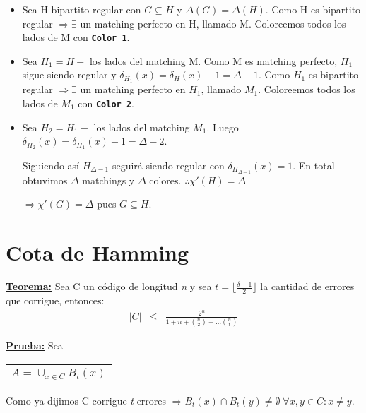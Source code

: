 \documentclass[12pt,a4paper]{report}
\newcounter{neq}
\begin{document}
			\vspace{5mm}
			\begin{itemize}
				\item Sea H bipartito regular con $G \subseteq H$ y $\Delta(G) = \Delta(H)$. Como H es bipartito regular $\Rightarrow \exists$ un matching perfecto en H, llamado M. Coloreemos todos los lados de M con \textbf{\texttt{Color 1}}.
				\item Sea $H_{1} = H - $ los lados del matching M. Como M es matching perfecto, $H_{1}$ sigue siendo regular y $\delta_{H_{1}}(x) = \delta_{H}(x) - 1 = \Delta - 1$. Como $H_{1}$ es bipartito regular $\Rightarrow \exists$ un matching perfecto en $H_{1}$, llamado $M_{1}$. Coloreemos todos los lados de $M_{1}$ con \textbf{\texttt{Color 2}}.
				\item Sea $H_{2} = H_{1} - $ los lados del matching $M_{1}$. Luego $\delta_{H_{2}}(x) = \delta_{H_{1}}(x) - 1 = \Delta - 2$.
					\par Siguiendo así $H_{\Delta - 1}$ seguirá siendo regular con $ \delta_{H_{\Delta - 1}}(x) = 1$. En total obtuvimos $ \Delta $ matchings y $ \Delta $ colores. $\therefore \chi '(H) = \Delta$
					\begin{center}
						$\Rightarrow \chi ' (G) = \Delta$ pues $G \subseteq H$.
					\end{center}
			\end{itemize}


	\section{Cota de Hamming}
		\textbf{\underline{Teorema:}} Sea C un código de longitud \textit{n} y sea $ t = \lfloor \frac{\delta - 1}{2} \rfloor$ la cantidad de errores que corrigue, entonces:
			\begin{eqnarray}
				\nonumber \lvert C \rvert &\leq & \frac{2^{n}}{1 + n + {n \choose 2} + \dotsc {n \choose t}}
			\end{eqnarray}

		\textbf{\underline{Prueba:}} Sea \begin{tabular}{|c|} \hline $ A = \cup_{x \in C} B_{t}(x) $ \\ \hline \end{tabular}

			\vspace{3mm}
				\par Como ya dijimos C corrigue \textit{t} errores $\Rightarrow B_{t}(x) \cap B_{t}(y) \neq \emptyset \; \forall x, y \in C : x \neq y$.
\end{document}
